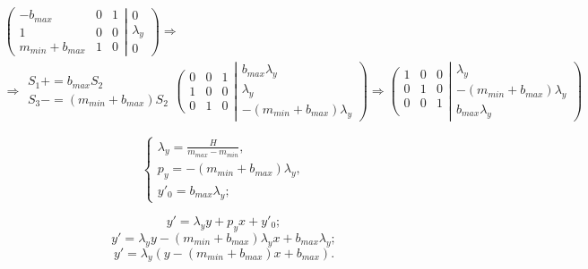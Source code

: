 $$
\begin{gathered}
	\left(
		\begin{array}{ccc}
			-b_{max} & 0 & 1 \\
			1 & 0 & 0 \\
			m_{min} + b_{max} & 1 & 0
		\end{array}
		\right.
		\left|
		\begin{array}{c}
			0 \\ \lambda_y \\ 0
		\end{array}
	\right)
	\Rightarrow\\
	\Rightarrow
	\begin{array}{c}
		S_1+=b_{max} S_2\\
		S_3-=(m_{min} + b_{max}) S_2
	\end{array}
	\left(
		\begin{array}{ccc}
			0 & 0 & 1 \\
			1 & 0 & 0 \\
			0 & 1 & 0
		\end{array}
		\right.
		\left|
		\begin{array}{c}
			b_{max}\lambda_y \\ 
			\lambda_y \\ 
			-(m_{min} + b_{max})\lambda_y
		\end{array}
	\right)
	\Rightarrow
	\left(
		\begin{array}{ccc}
			1 & 0 & 0 \\
			0 & 1 & 0 \\
			0 & 0 & 1 \\
		\end{array}
		\right.
		\left|
		\begin{array}{c}
			\lambda_y \\ 
			-(m_{min} + b_{max})\lambda_y\\
			b_{max}\lambda_y
		\end{array}
	\right)
\end{gathered}
$$

$$
\left\{
\begin{gathered}
	\lambda_y = \frac{H}{m_{max} - m_{min}},\\
	p_y = -(m_{min} + b_{max})\lambda_y,\\
	y'_0 = b_{max}\lambda_y;
\end{gathered}
\right.
$$

$$y' = \lambda_y y + p_y x + y'_0;$$
$$y' = \lambda_y y -(m_{min} + b_{max})\lambda_y x + b_{max}\lambda_y;$$
$$y' = \lambda_y \left( y - (m_{min} + b_{max}) x + b_{max} \right).$$